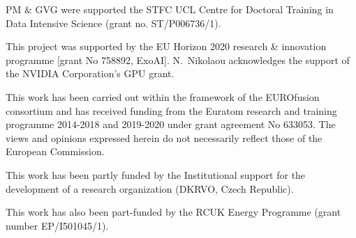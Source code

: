 {\footnotesize
PM \& GVG were supported the STFC UCL Centre for Doctoral Training in Data Intensive
Science (grant no. ST/P006736/1).

This project was supported by the EU Horizon 2020 research \& innovation
programme [grant No 758892, ExoAI]. N.~Nikolaou acknowledges the support of the NVIDIA Corporation’s GPU grant.

This work has been carried out within the framework of the EUROfusion consortium and has received funding from the Euratom research and training programme 2014-2018 and 2019-2020 under grant agreement No 633053. The views and opinions expressed herein do not necessarily reflect those of the European Commission.

This work has been partly funded by the Institutional support for the
development of a research organization (DKRVO, Czech Republic).

This work has also been part-funded by the RCUK Energy Programme (grant number EP/I501045/1).
}
